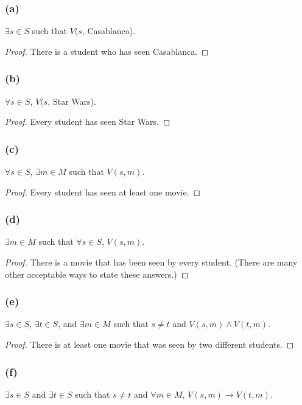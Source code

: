\documentclass[14pt]{extarticle}
\newcommand{\fa}{\forall}
\newcommand{\te}{\exists}
\begin{document}
\subsubsection{(a)}
$\te s \in S$ such that $V(s$, Casablanca).

\begin{proof}
    There is a student who has seen Casablanca.
\end{proof}

\subsubsection{(b)}
$\fa s \in S$, $V(s$, Star Wars).

\begin{proof}
    Every student has seen Star Wars.
\end{proof}

\subsubsection{(c)}
$\fa s \in S$, $\te m \in M$ such that $V(s, m)$.

\begin{proof}
    Every student has seen at least one movie.
\end{proof}

\subsubsection{(d)}
$\te m \in M$ such that $\fa s \in S$, $V(s, m)$.

\begin{proof}
    There is a movie that has been seen by every student. (There are many other acceptable ways to state these answers.)
\end{proof}

\subsubsection{(e)}
$\te s \in S$, $\te t \in S$, and $\te m \in M$ such that $s \neq t$ and $V(s, m) \wedge V(t, m)$.

\begin{proof}
    There is at least one movie that was seen by two different students.
\end{proof}

\subsubsection{(f)}
$\te s \in S$ and $\te t \in S$ such that $s \neq t$ and $\fa m \in M$, $V(s, m) \to V(t, m)$.
\end{document}
